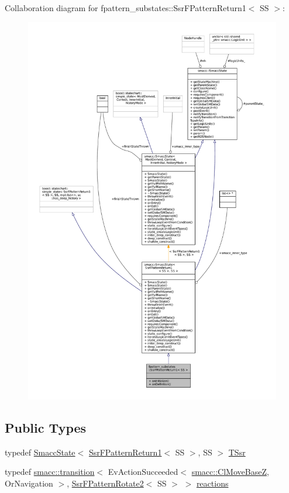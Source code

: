 Collaboration diagram for fpattern\+\_\+substates\+:\+:Ssr\+F\+Pattern\+Return1$<$ SS $>$\+:
\nopagebreak
\begin{figure}[H]
\begin{center}
\leavevmode
\includegraphics[width=350pt]{structfpattern__substates_1_1SsrFPatternReturn1__coll__graph}
\end{center}
\end{figure}
\subsection*{Public Types}
\begin{DoxyCompactItemize}
\item 
typedef \hyperlink{classSmaccState}{Smacc\+State}$<$ \hyperlink{structfpattern__substates_1_1SsrFPatternReturn1}{Ssr\+F\+Pattern\+Return1}$<$ SS $>$, SS $>$ \hyperlink{structfpattern__substates_1_1SsrFPatternReturn1_a50f9750abde55c952316c66699d1e233}{T\+Ssr}
\item 
typedef \hyperlink{classsmacc_1_1transition}{smacc\+::transition}$<$ Ev\+Action\+Succeeded$<$ \hyperlink{classsmacc_1_1ClMoveBaseZ}{smacc\+::\+Cl\+Move\+BaseZ}, Or\+Navigation $>$, \hyperlink{structfpattern__substates_1_1SsrFPatternRotate2}{Ssr\+F\+Pattern\+Rotate2}$<$ SS $>$ $>$ \hyperlink{structfpattern__substates_1_1SsrFPatternReturn1_a93bd6922760543898863d82124bd1932}{reactions}
\end{DoxyCompactItemize}
